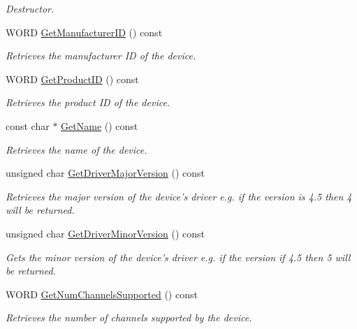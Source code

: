 \begin{DoxyCompactItemize}
\begin{DoxyCompactList}\small\item\em Destructor. \item\end{DoxyCompactList}\item 
WORD \hyperlink{class_sound_device_input_aab0db70bbed1a8c2853069353cdd262c}{GetManufacturerID} () const 
\begin{DoxyCompactList}\small\item\em Retrieves the manufacturer ID of the device. \item\end{DoxyCompactList}\item 
WORD \hyperlink{class_sound_device_input_a13cdfcc788f41cbb03164788d30a9f51}{GetProductID} () const 
\begin{DoxyCompactList}\small\item\em Retrieves the product ID of the device. \item\end{DoxyCompactList}\item 
const char $\ast$ \hyperlink{class_sound_device_input_a6ee7005f81d8320201d5ea3dda6207b6}{GetName} () const 
\begin{DoxyCompactList}\small\item\em Retrieves the name of the device. \item\end{DoxyCompactList}\item 
unsigned char \hyperlink{class_sound_device_input_a4326e170cc6fa4e91bb07011e75346c2}{GetDriverMajorVersion} () const 
\begin{DoxyCompactList}\small\item\em Retrieves the major version of the device's driver e.g. if the version is 4.5 then 4 will be returned. \item\end{DoxyCompactList}\item 
unsigned char \hyperlink{class_sound_device_input_ae0f28a79d3cd558f83ed4efe6d042f2f}{GetDriverMinorVersion} () const 
\begin{DoxyCompactList}\small\item\em Gets the minor version of the device's driver e.g. if the version if 4.5 then 5 will be returned. \item\end{DoxyCompactList}\item 
WORD \hyperlink{class_sound_device_input_a0893f534c2dfe7f39ed7355863e7789a}{GetNumChannelsSupported} () const 
\begin{DoxyCompactList}\small\item\em Retrieves the number of channels supported by the device. \item\end{DoxyCompactList}\end{DoxyCompactItemize}

